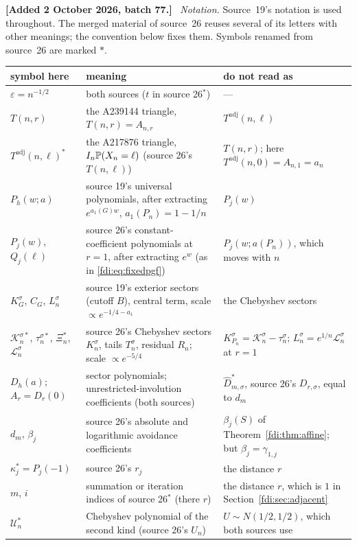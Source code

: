 \documentclass[11pt,letterpaper]{article}
\theoremstyle{remark}\newtheorem{remark}[theorem]{Remark}
\newcommand{\eps}{\varepsilon}\newcommand{\Pois}{\operatorname{Poisson}}
\newcommand{\Tadj}{T^{\mathrm{adj}}}
\newenvironment{mergenote}[1][2 October 2026, batch 77]{\par\smallskip\begingroup\small\noindent\textbf{[Added #1.]}\ }{\endgroup\par\smallskip}
\begin{document}
\begin{mergenote}
\emph{Notation.} Source~19's notation is used throughout. The merged material of source~26 reuses several of its letters with other meanings; the convention below fixes them. Symbols renamed from source~26 are marked $\ast$.
\begin{center}\small
\begin{tabular}{@{}>{\raggedright\arraybackslash}p{2.6cm}>{\raggedright\arraybackslash}p{5.6cm}>{\raggedright\arraybackslash}p{6.0cm}@{}}
\toprule
symbol here&meaning&do not read as\\
\midrule
$\eps=n^{-1/2}$&both sources ($t$ in source 26$^\ast$)&---\\
$T(n,r)$&the A239144 triangle, $T(n,r)=A_{n,r}$&$\Tadj(n,\ell)$\\
$\Tadj(n,\ell)^\ast$&the A217876 triangle, $I_n\mathbb P(X_n=\ell)$ (source 26's $T(n,\ell)$)&$T(n,r)$; here $\Tadj(n,0)=A_{n,1}=a_n$\\
$P_h(w;a)$&source 19's universal polynomials, after extracting $e^{a_1(G)w}$, $a_1(P_n)=1-1/n$&$P_j(w)$\\
$P_j(w)$, $Q_j(\ell)$&source 26's constant-coefficient polynomials at $r=1$, after extracting $e^{w}$ (as in \eqref{fdi:eq:fixedpgf})&$P_j(w;a(P_n))$, which moves with $n$\\
$K_G^\sigma$, $C_G$, $L_n^\sigma$&source 19's exterior sectors (cutoff $B$), central term, scale $\propto e^{-1/4-a_1}$&the Chebyshev sectors\\
$\mathcal K_n^{\sigma\ast}$, $\tau_n^{\sigma\ast}$, $\Xi_n^\ast$, $\mathcal L_n^\sigma$&source 26's Chebyshev sectors $K_n^\sigma$, tails $T_n^\sigma$, residual $R_n$; scale $\propto e^{-5/4}$&$K_{P_n}^\sigma=\mathcal K_n^\sigma-\tau_n^\sigma$; $L^\sigma_n=e^{1/n}\mathcal L^\sigma_n$ at $r=1$\\
$D_h(a)$; $A_r=D_r(0)$&sector polynomials; unrestricted-involution coefficients (both sources)&$\widehat D_{m,\sigma}^\ast$, source 26's $D_{r,\sigma}$, equal to $d_m$\\
$d_m$, $\beta_j$&source 26's absolute and logarithmic avoidance coefficients&$\beta_j(S)$ of Theorem~\ref{fdi:thm:affine}; but $\beta_j=\gamma_{1,j}$\\
$\kappa_j^\ast=P_j(-1)$&source 26's $r_j$&the distance $r$\\
$m$, $i$&summation or iteration indices of source 26$^\ast$ (there $r$)&the distance $r$, which is $1$ in Section~\ref{fdi:sec:adjacent}\\
$\mathcal U_n^\ast$&Chebyshev polynomial of the second kind (source 26's $U_n$)&$U\sim N(1/2,1/2)$, which both sources use\\

\end{tabular}
\end{center}
\end{mergenote}
\end{document}
